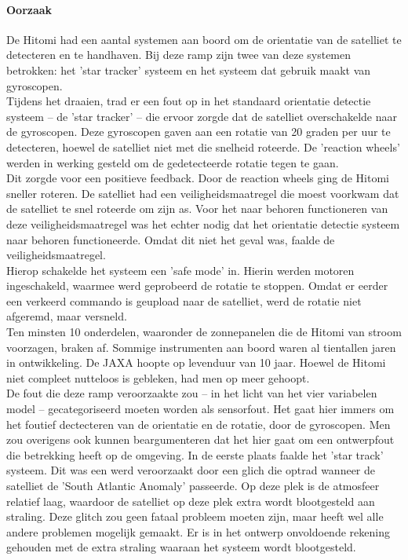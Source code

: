 \documentclass{article}
\begin{document}
				\paragraph{Oorzaak}

					De Hitomi had een aantal systemen aan boord om de orientatie van de satelliet te detecteren en te handhaven. Bij deze ramp zijn twee van deze systemen betrokken: het 'star tracker' systeem en het systeem dat gebruik maakt van gyroscopen. \\
					 Tijdens het draaien, trad er een fout op in het standaard orientatie detectie systeem -- de 'star tracker' -- die ervoor zorgde dat de satelliet overschakelde naar de gyroscopen. Deze gyroscopen gaven aan een rotatie van 20 graden per uur te detecteren, hoewel de satelliet niet met die snelheid roteerde. De 'reaction wheels' werden in werking gesteld om de gedetecteerde rotatie tegen te gaan. \\
					Dit zorgde voor een positieve feedback. Door de reaction wheels ging de Hitomi sneller roteren. De satelliet had een veiligheidsmaatregel die moest voorkwam dat de satelliet te snel roteerde om zijn as. Voor het naar behoren functioneren van deze veiligheidsmaatregel was het echter nodig dat het orientatie detectie systeem naar behoren functioneerde. Omdat dit niet het geval was, faalde de veiligheidsmaatregel. \\
					Hierop schakelde het systeem een 'safe mode' in. Hierin werden motoren ingeschakeld, waarmee werd geprobeerd de rotatie te stoppen. Omdat er eerder een verkeerd commando is geupload naar de satelliet, werd de rotatie niet afgeremd, maar versneld. \\
					Ten minsten 10 onderdelen, waaronder de zonnepanelen die de Hitomi van stroom voorzagen, braken af. Sommige instrumenten aan boord waren al tientallen jaren in ontwikkeling. De JAXA hoopte op levenduur van 10 jaar. Hoewel de Hitomi niet compleet nutteloos is gebleken, had men op meer gehoopt. \cite{witze2016software} \\
					De fout die deze ramp veroorzaakte zou -- in het licht van het vier variabelen model -- gecategoriseerd moeten worden als sensorfout. Het gaat hier immers om het foutief dectecteren van de orientatie en de rotatie, door de gyroscopen. Men zou overigens ook kunnen beargumenteren dat het hier gaat om een ontwerpfout die betrekking heeft op de omgeving. In de eerste plaats faalde het 'star track' systeem. Dit was een werd veroorzaakt door een glich die optrad wanneer de satelliet de 'South Atlantic Anomaly' passeerde. Op deze plek is de atmosfeer relatief laag, waardoor de satelliet op deze plek extra wordt blootgesteld aan straling. Deze glitch zou geen fataal probleem moeten zijn, maar heeft wel alle andere problemen mogelijk gemaakt. Er is in het ontwerp onvoldoende rekening gehouden met de extra straling waaraan het systeem wordt blootgesteld. \par
				
\end{document}
